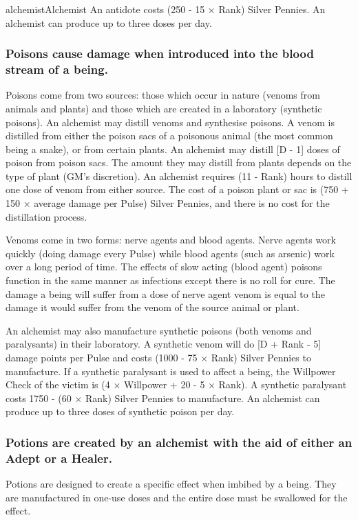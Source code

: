 \begin{Skill}[1.1]{alchemist}{Alchemist}
An antidote costs (250 - 15 × Rank) Silver Pennies.  An alchemist can
produce up to three doses per day.

\subsubsection{Poisons cause damage when introduced into the 
blood stream of a being.}

Poisons come from two sources: those which occur in nature (venoms
from animals and plants) and those which are created in a laboratory
(synthetic poisons).  An alchemist may distill venoms and synthesise
poisons.  A venom is distilled from either the poison sacs of a
poisonous animal (the most common being a snake), or from certain
plants.  An alchemist may distill [D - 1] doses of poison from poison
sacs.  The amount they may distill from plants depends on the type of
plant (GM’s discretion).  An alchemist requires (11 - Rank) hours to
distill one dose of venom from either source.  The cost of a poison
plant or sac is (750 + 150 × average damage per Pulse) Silver Pennies,
and there is no cost for the distillation process.

Venoms come in two forms: nerve agents and blood agents.  Nerve agents
work quickly (doing damage every Pulse) while blood agents (such as
arsenic) work over a long period of time.  The effects of slow acting
(blood agent) poisons function in the same manner as infections except
there is no roll for cure. The damage a being will suffer from a dose
of nerve agent venom is equal to the damage it would suffer from the
venom of the source animal or plant.

An alchemist may also manufacture synthetic poisons (both venoms and
paralysants) in their laboratory. A synthetic venom will do [D + Rank
  - 5] damage points per Pulse and costs (1000 - 75 × Rank) Silver
Pennies to manufacture. If a synthetic paralysant is used to affect a
being, the Willpower Check of the victim is (4 × Willpower + 20 - 5 ×
Rank).  A synthetic paralysant costs 1750 - (60 × Rank) Silver Pennies
to manufacture. An alchemist can produce up to three doses of
synthetic poison per day.

\subsubsection{Potions are created by an alchemist with the aid of either an Adept or
a Healer.}

Potions are designed to create a specific effect when imbibed by a
being.  They are manufactured in one-use doses and the entire dose
must be swallowed for the effect.


\end{Skill}
